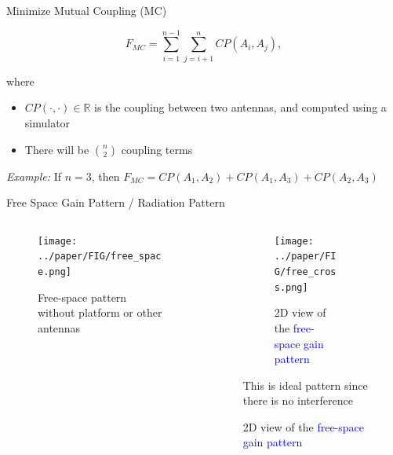 \documentclass{beamer}
\begin{document}
\begin{frame}{Minimize Mutual Coupling (MC)}
    \begin{tcolorbox}[colback=green!5]
        \begin{equation}
            F_{MC} = \sum_{i=1}^{n-1}\sum_{j=i+1}^{n} CP(A_i, A_j),
        \end{equation}
    \end{tcolorbox}
    where
    \begin{itemize}
        \item $CP(\cdot, \cdot) \in \mathbb R$ is the coupling between two antennas, and computed using a simulator
        \item There will be $n \choose 2$ coupling terms 
    \end{itemize}
    \vspace{2mm}
    \small\textit{Example:} If $n=3$, then $F_{MC} = CP(A_1, A_2) + CP(A_1, A_3) + CP(A_2, A_3)$
\end{frame}

\begin{frame}{Free Space Gain Pattern / Radiation Pattern}
    \begin{columns}
        \begin{column}{0.5\linewidth}
            \begin{figure}
                \vspace{-2.5cm}
                \centering
                \texttt{[image: ../paper/FIG/free\_space.png]}
                \caption*{\tiny Free-space pattern without platform or other antennas}
            \end{figure}
        \end{column}
        \begin{column}{0.5\linewidth}
            \begin{overlayarea}{\textwidth}{\textheight}
                \begin{figure}
                    \begin{subfigure}{\columnwidth}
                        \centering
                        \texttt{[image: ../paper/FIG/free\_cross.png]}
                        \caption*{\tiny 2D view of the \textcolor{blue}{free-space gain pattern}}%
                    \end{subfigure}\vspace*{2mm}
                    \begin{tcolorbox}[colback=green!5]
                        \centering
                        This is ideal pattern since there is no interference
                    \end{tcolorbox}
                \end{figure}
            \end{overlayarea}
        \end{column}
    \end{columns}
\end{frame}
\end{document}
